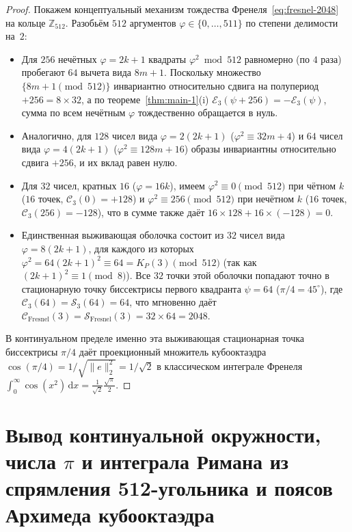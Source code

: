 \documentclass[11pt,a4paper]{article}
\theoremstyle{plain}
\theoremstyle{definition}
\begin{document}
\begin{proof}
Покажем концептуальный механизм тождества Френеля~\eqref{eq:fresnel-2048} на кольце $\mathbb{Z}_{512}$. Разобьём $512$ аргументов $\varphi\in\{0,\dots,511\}$ по степени делимости на~$2$:
\begin{itemize}[noitemsep,leftmargin=*]
\item Для $256$ нечётных $\varphi=2k+1$ квадраты $\varphi^2\bmod 512$ равномерно (по $4$ раза) пробегают $64$ вычета вида $8m+1$. Поскольку множество $\{8m+1\pmod{512}\}$ инвариантно относительно сдвига на полупериод $+256 = 8\times 32$, а по теореме~\ref{thm:main-1}(i) $\mathcal{E}_3(\psi+256) = -\mathcal{E}_3(\psi)$, сумма по всем нечётным $\varphi$ тождественно обращается в нуль.
\item Аналогично, для $128$ чисел вида $\varphi=2(2k+1)$ ($\varphi^2\equiv 32m+4$) и $64$ чисел вида $\varphi=4(2k+1)$ ($\varphi^2\equiv 128m+16$) образы инвариантны относительно сдвига $+256$, и их вклад равен нулю.
\item Для $32$ чисел, кратных $16$ ($\varphi=16k$), имеем $\varphi^2\equiv 0\pmod{512}$ при чётном $k$ ($16$ точек, $\mathcal{C}_3(0)=+128$) и $\varphi^2\equiv 256\pmod{512}$ при нечётном $k$ ($16$ точек, $\mathcal{C}_3(256)=-128$), что в сумме также даёт $16\times 128 + 16\times(-128)=0$.
\item Единственная выживающая оболочка состоит из $32$ чисел вида $\varphi = 8(2k+1)$, для каждого из которых $\varphi^2 = 64(2k+1)^2 \equiv 64 = K_P(3) \pmod{512}$ (так как $(2k+1)^2\equiv 1\pmod 8$). Все $32$ точки этой оболочки попадают точно в стационарную точку биссектрисы первого квадранта $\psi = 64$ ($\pi/4 = 45^\circ$), где $\mathcal{C}_3(64)=\mathcal{S}_3(64)=64$, что мгновенно даёт $\mathcal{C}_{\mathrm{Fresnel}}(3)=\mathcal{S}_{\mathrm{Fresnel}}(3) = 32\times 64 = 2048$.
\end{itemize}
В континуальном пределе именно эта выживающая стационарная точка биссектрисы $\pi/4$ даёт проекционный множитель кубооктаэдра $\cos(\pi/4) = 1/\sqrt{\|e\|_2^2} = 1/\sqrt{2}$ в классическом интеграле Френеля $\int_0^\infty\cos(x^2)\,\mathrm{d}x = \frac{1}{\sqrt{2}}\frac{\sqrt{\pi}}{2}$.
\end{proof}

\section{Вывод континуальной окружности, числа \texorpdfstring{$\pi$}{pi} и интеграла Римана из спрямления 512-угольника и поясов Архимеда кубооктаэдра}
\label{sec:continuum-emergence}
\end{document}
